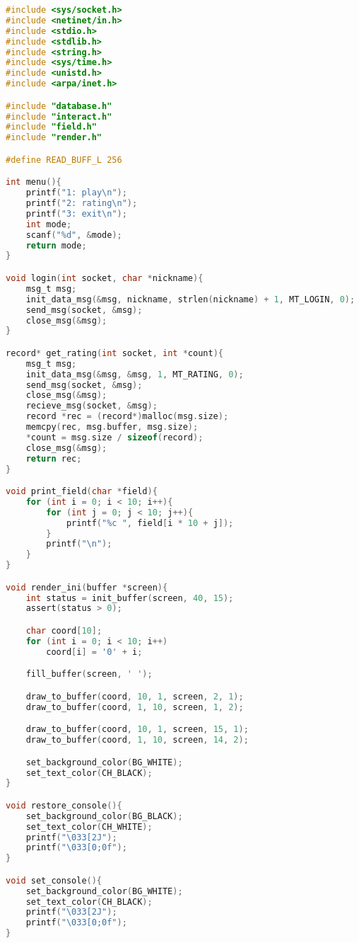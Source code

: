 \documentclass[12pt]{article}
\begin{document}
\begin{lstlisting}[language=C, basicstyle=\scriptsize]
#include <sys/socket.h>
#include <netinet/in.h>
#include <stdio.h>
#include <stdlib.h>
#include <string.h>
#include <sys/time.h>
#include <unistd.h>
#include <arpa/inet.h>

#include "database.h"
#include "interact.h"
#include "field.h"
#include "render.h"

#define READ_BUFF_L 256

int menu(){
    printf("1: play\n");
    printf("2: rating\n");
    printf("3: exit\n");
    int mode;
    scanf("%d", &mode);
    return mode;
}

void login(int socket, char *nickname){
    msg_t msg;
    init_data_msg(&msg, nickname, strlen(nickname) + 1, MT_LOGIN, 0);
    send_msg(socket, &msg);
    close_msg(&msg);
}

record* get_rating(int socket, int *count){
    msg_t msg;
    init_data_msg(&msg, &msg, 1, MT_RATING, 0);
    send_msg(socket, &msg);
    close_msg(&msg);
    recieve_msg(socket, &msg);
    record *rec = (record*)malloc(msg.size);
    memcpy(rec, msg.buffer, msg.size);
    *count = msg.size / sizeof(record);
    close_msg(&msg);
    return rec;
}

void print_field(char *field){
    for (int i = 0; i < 10; i++){
        for (int j = 0; j < 10; j++){
            printf("%c ", field[i * 10 + j]);
        }
        printf("\n");
    }
}

void render_ini(buffer *screen){
    int status = init_buffer(screen, 40, 15);
    assert(status > 0);

    char coord[10];
    for (int i = 0; i < 10; i++)
        coord[i] = '0' + i;

    fill_buffer(screen, ' ');

    draw_to_buffer(coord, 10, 1, screen, 2, 1);
    draw_to_buffer(coord, 1, 10, screen, 1, 2);

    draw_to_buffer(coord, 10, 1, screen, 15, 1);
    draw_to_buffer(coord, 1, 10, screen, 14, 2);

    set_background_color(BG_WHITE);
    set_text_color(CH_BLACK);
}

void restore_console(){
    set_background_color(BG_BLACK);
    set_text_color(CH_WHITE);
    printf("\033[2J");
    printf("\033[0;0f");
}

void set_console(){
    set_background_color(BG_WHITE);
    set_text_color(CH_BLACK);
    printf("\033[2J");
    printf("\033[0;0f");
}


\end{lstlisting}
\end{document}
